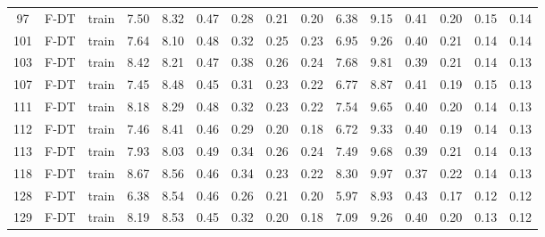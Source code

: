 \begin{table}
\begin{tabular}{@{\hskip3pt}c@{\hskip3pt}c@{\hskip3pt}c@{\hskip3pt}c@{\hskip3pt}c@{\hskip3pt}c@{\hskip3pt}c@{\hskip3pt}c@{\hskip3pt}c@{\hskip3pt}c@{\hskip3pt}c@{\hskip3pt}c@{\hskip3pt}c@{\hskip3pt}c@{\hskip3pt}c}
         97 &           F-DT &                     train &              7.50 &        8.32 &          0.47 &        0.28 &        0.21 &         0.20 &                6.38 &        9.15 &          0.41 &        0.20 &        0.15 &         0.14 \\
        101 &           F-DT &                     train &              7.64 &        8.10 &          0.48 &        0.32 &        0.25 &         0.23 &                6.95 &        9.26 &          0.40 &        0.21 &        0.14 &         0.14 \\
        103 &           F-DT &                     train &              8.42 &        8.21 &          0.47 &        0.38 &        0.26 &         0.24 &                7.68 &        9.81 &          0.39 &        0.21 &        0.14 &         0.13 \\
        107 &           F-DT &                     train &              7.45 &        8.48 &          0.45 &        0.31 &        0.23 &         0.22 &                6.77 &        8.87 &          0.41 &        0.19 &        0.15 &         0.13 \\
        111 &           F-DT &                     train &              8.18 &        8.29 &          0.48 &        0.32 &        0.23 &         0.22 &                7.54 &        9.65 &          0.40 &        0.20 &        0.14 &         0.13 \\
        112 &           F-DT &                     train &              7.46 &        8.41 &          0.46 &        0.29 &        0.20 &         0.18 &                6.72 &        9.33 &          0.40 &        0.19 &        0.14 &         0.13 \\
        113 &           F-DT &                     train &              7.93 &        8.03 &          0.49 &        0.34 &        0.26 &         0.24 &                7.49 &        9.68 &          0.39 &        0.21 &        0.14 &         0.13 \\
        118 &           F-DT &                     train &              8.67 &        8.56 &          0.46 &        0.34 &        0.23 &         0.22 &                8.30 &        9.97 &          0.37 &        0.22 &        0.14 &         0.13 \\
        128 &           F-DT &                     train &              6.38 &        8.54 &          0.46 &        0.26 &        0.21 &         0.20 &                5.97 &        8.93 &          0.43 &        0.17 &        0.12 &         0.12 \\
        129 &           F-DT &                     train &              8.19 &        8.53 &          0.45 &        0.32 &        0.20 &         0.18 &                7.09 &        9.26 &          0.40 &        0.20 &        0.13 &         0.12 \\

\end{tabular}
\end{table}
